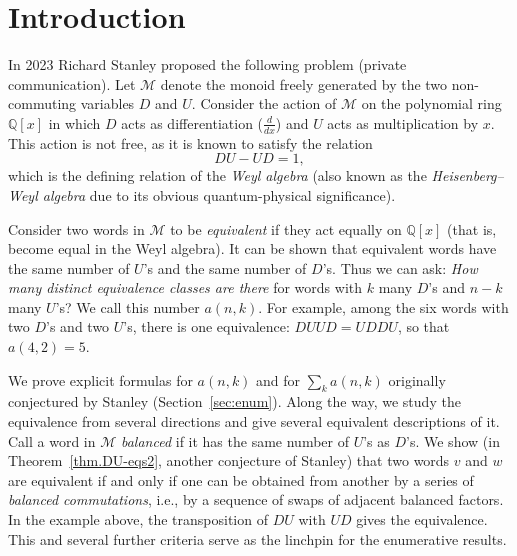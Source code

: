 \documentclass[numbers=enddot,12pt,final,onecolumn,notitlepage]{scrartcl}%
\theoremstyle{definition}
\newcommand{\M}{\mathcal{M}}
\newcommand{\QQ}{\mathbb{Q}}
\newcommand{\ive}[1]{\left[ #1 \right]}
\begin{document}
\section{Introduction}\label{sec:intro}

In 2023 Richard Stanley proposed the following problem (private communication).  Let 
$\mathcal{M}$ denote the monoid freely generated by the two non-commuting variables $D$ and $U$.
Consider the action of $\M$ on the polynomial ring $\QQ\ive{x}$ in which $D$ acts as differentiation ($\frac{d}{dx}$) and $U$ acts as multiplication by $x$.
This action is not free, as it is known to satisfy the relation
\begin{equation}\label{eq:Weyl}
DU-UD = 1 ,
\end{equation}
which is the defining relation of the \emph{Weyl algebra}
(also known as the \emph{Heisenberg--Weyl algebra} \cite{GoF09} due to its obvious quantum-physical significance).

Consider two words in $\M$ to be \emph{equivalent} if they act equally on $\QQ\ive{x}$ (that is, become equal in the Weyl algebra).
It can be shown that equivalent words have the same number of $U$'s and the same number of $D$'s.
Thus we can ask: \textit{How many distinct equivalence classes
are there} for words with $k$ many $D$'s and $n-k$ many $U$'s?
We call this number $a(n,k)$.  For example, among the six words with two $D$'s
and two $U$'s, there is one equivalence: $DUUD = UDDU$, so that $a(4,2)=5$.

We prove explicit formulas for $a(n,k)$ and for $\sum_k a(n,k)$ originally conjectured by Stanley (Section~\ref{sec:enum}).
Along the way, we study the equivalence from several directions and give several equivalent descriptions of it.
Call a word in $\M$ \textit{balanced} if it has the same number of $U$'s
as $D$'s.
We show (in Theorem~\ref{thm.DU-eqs2}, another conjecture of Stanley) that two words $v$ and $w$ are equivalent if and only if one can be obtained from
another by a series of \textit{balanced commutations}, i.e., by a sequence of swaps of
adjacent balanced factors.  In the example above, the transposition of $DU$ with $UD$ gives
the equivalence.
This and several further criteria serve as the linchpin for the enumerative results. 
\end{document}
